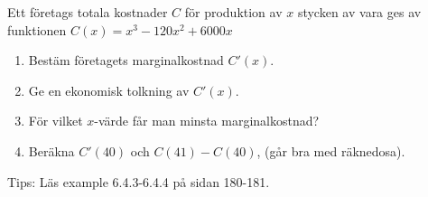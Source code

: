 


Ett företags totala kostnader $C$ för produktion av $x$ stycken av vara ges av funktionen $C(x) = x^3-120x^2+6000x $
\begin{enumerate}
\item Bestäm företagets marginalkostnad $C'(x)$.
\item Ge en ekonomisk tolkning av $C'(x)$. 
\item För vilket $x$-värde får man minsta marginalkostnad?
\item Beräkna $C'(40)$ och $C(41)-C(40)$, (går bra med räknedosa).
\end{enumerate}
Tips: Läs example 6.4.3-6.4.4 på sidan 180-181.